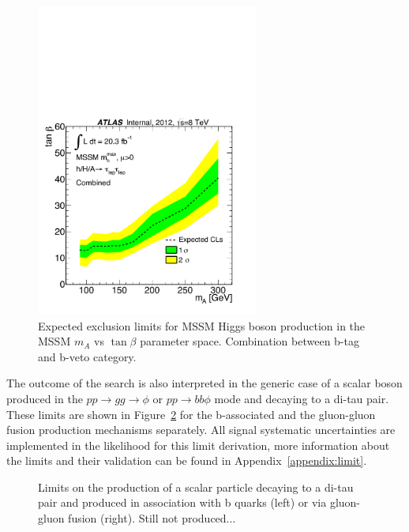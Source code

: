 \begin{figure}[tp]
  \centering
  \includegraphics[width=0.65\textwidth]{figure/limits/Limits_mAtanBeta_Comb.pdf}
  \caption{Expected %
  exclusion limits for MSSM Higgs boson production 
in the MSSM $m_A$ vs $\tan\beta$ parameter space. Combination between b-tag and b-veto category.}
\label{fig:limit_extract_combined}
\end{figure}


The outcome of the search is also interpreted in the generic case of a scalar boson produced in the
$pp \rightarrow gg \rightarrow \phi$ or $pp \rightarrow bb\phi$ mode and decaying to a di-tau pair.
These limits are shown in Figure~\ref{fig:limit_xs} 
for the b-associated  and the gluon-gluon fusion production mechanisms separately.
All signal systematic uncertainties are implemented in the likelihood
for this limit derivation, more information about the limits and their validation can be found in Appendix~\ref{appendix:limit}.

\begin{figure}[tp]
  \centering
  \caption{ Limits on the production of a scalar particle decaying to a di-tau pair
    and produced     in association with b quarks (left) or   via gluon-gluon fusion (right). Still not produced...}
\label{fig:limit_xs}
\end{figure}

